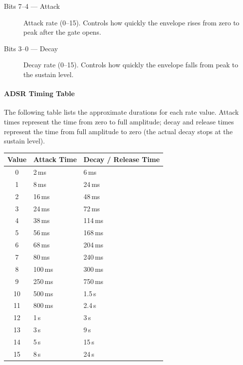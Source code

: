 


\begin{description}
  \item[Bits 7--4 --- Attack] Attack rate (0--15).  Controls how quickly the
        envelope rises from zero to peak after the gate opens.
  \item[Bits 3--0 --- Decay] Decay rate (0--15).  Controls how quickly the
        envelope falls from peak to the sustain level.
\end{description}

\paragraph{ADSR Timing Table}
The following table lists the approximate durations for each rate value.
Attack times represent the time from zero to full amplitude; decay and
release times represent the time from full amplitude to zero (the actual
decay stops at the sustain level).

\begin{center}
\small
\begin{tabular}{@{}cll@{}}
\toprule
\textbf{Value} & \textbf{Attack Time} & \textbf{Decay / Release Time} \\
\midrule
0  & 2\,ms   & 6\,ms   \\
1  & 8\,ms   & 24\,ms  \\
2  & 16\,ms  & 48\,ms  \\
3  & 24\,ms  & 72\,ms  \\
4  & 38\,ms  & 114\,ms \\
5  & 56\,ms  & 168\,ms \\
6  & 68\,ms  & 204\,ms \\
7  & 80\,ms  & 240\,ms \\
8  & 100\,ms & 300\,ms \\
9  & 250\,ms & 750\,ms \\
10 & 500\,ms & 1.5\,s  \\
11 & 800\,ms & 2.4\,s  \\
12 & 1\,s    & 3\,s    \\
13 & 3\,s    & 9\,s    \\
14 & 5\,s    & 15\,s   \\
15 & 8\,s    & 24\,s   \\
\bottomrule
\end{tabular}
\end{center}


